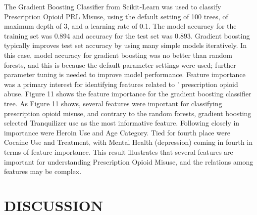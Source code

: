 \documentclass[sigconf]{acmart}
\begin{document}
The Gradient Boosting Classifier from Scikit-Learn was used to classify 
Prescription Opioid PRL Misuse, using the default setting of 100 trees, of 
maximum depth of 3, and a learning rate of 0.1. The model accuracy for the
training set was 0.894 and accuracy for the test set was 0.893. Gradient 
boosting typically improves test set accuracy by using many simple models 
iteratively. In this case, model accuracy for gradient boosting was no better 
than random forests, and this is because the default parameter settings were
used; further parameter tuning is needed to improve model performance. Feature 
importance was a primary interest for identifying features related to '
prescription opioid abuse. Figure 11 shows the feature importance for the 
gradient boosting classifier tree. As Figure 11 shows, several features were 
important for classifying prescription opioid misuse, and contrary to the 
random forests, gradient boosting selected Tranquilizer use as the most 
informative feature. Following closely in importance were Heroin Use and Age 
Category. Tied for fourth place were Cocaine Use and Treatment, with Mental 
Health (depression) coming in fourth in terms of feature importance. This 
result illustrates that several features are important for understanding 
Prescription Opioid Misuse, and the relations among features may be complex.




\section{DISCUSSION}
\end{document}
